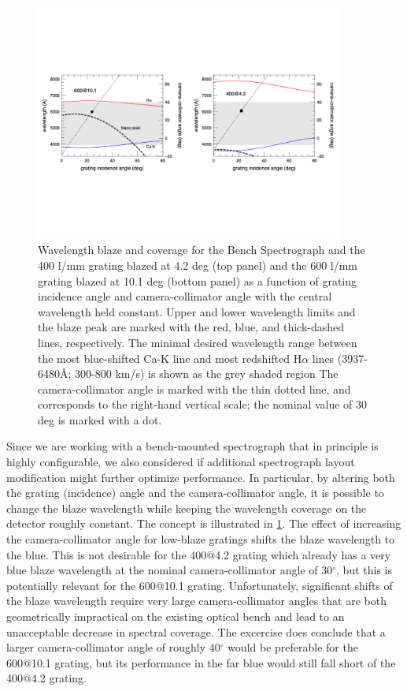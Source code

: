 \begin{appendices}
\begin{figure}[htb]
  \centering
\vskip -1.25in
  \includegraphics[width=0.9\textwidth]{891_1/figs/blaze_plot_land.pdf}
\vskip -1.25in
\caption{\label{fig:spec_config}\fixspacing Wavelength blaze and
  coverage for the Bench Spectrograph and the 400 l/mm grating blazed
  at 4.2 deg (top panel) and the 600 l/mm grating blazed at 10.1 deg
  (bottom panel) as a function of grating incidence angle and
  camera-collimator angle with the central wavelength held
  constant. Upper and lower wavelength limits and the blaze peak are
  marked with the red, blue, and thick-dashed lines, respectively. The
  minimal desired wavelength range between the most blue-shifted Ca-K
  line and most redshifted H$\alpha$ lines (3937-6480\AA; 300-800
  km/s) is shown as the grey shaded region The camera-collimator angle
  is marked with the thin dotted line, and corresponds to the
  right-hand vertical scale; the nominal value of 30 deg is marked
  with a dot.}
\end{figure}

Since we are working with a bench-mounted spectrograph that in
principle is highly configurable, we also considered if additional
spectrograph layout modification might further optimize
performance. In particular, by altering both the grating (incidence)
angle and the camera-collimator angle, it is possible to change the
blaze wavelength while keeping the wavelength coverage on the detector
roughly constant. The concept is illustrated in \ref{fig:spec_config}.
The effect of increasing the camera-collimator angle for low-blaze
gratings shifts the blaze wavelength to the blue. This is not
desirable for the 400@4.2 grating which already has a very blue blaze
wavelength at the nominal camera-collimator angle of 30$^{\circ}$, but
this is potentially relevant for the 600@10.1 grating. Unfortunately,
significant shifts of the blaze wavelength require very large
camera-collimator angles that are both geometrically impractical on
the existing optical bench and lead to an unacceptable decrease in
spectral coverage. The excercise does conclude that a larger
camera-collimator angle of roughly 40$^{\circ}$ would be preferable
for the 600@10.1 grating, but its performance in the far blue would
still fall short of the 400@4.2 grating.


\end{appendices}
